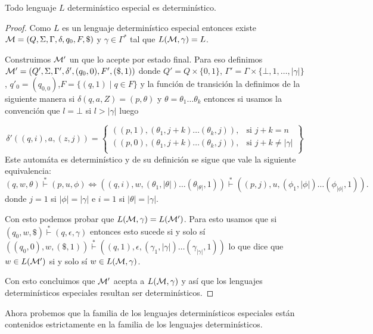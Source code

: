 \documentclass[tesis.tex]{subfiles}
\begin{document}
\begin{prop}
	Todo lenguaje $L$ \ic determinístico especial es \ic determinístico.
\end{prop}
\begin{proof}
	Como $L$ es un lenguaje \ic determinístico especial entonces existe ${\cal M} = (Q,\Sigma, \Gamma, \delta, q_0, F, \$)$ \APD y $\gamma \in \Gamma^{*}$ tal que $L({\cal M}, \gamma) = L$.
	
	Construimos $\cal M'$ un \APD que lo acepte por estado final.
	Para eso definimos ${\cal M}' = (Q',\Sigma, \Gamma', \delta', (q_0,0), F', (\$,1))$
	donde $Q' = Q \times \{ 0,1\}$, $\Gamma' = \Gamma \times \{ \bot ,1, \dots, |\gamma|  \}$, $q'_{0} = (q_{0, 0})$,$F = \{ (q,1) \mid q \in F \}$ y la función de transición la definimos de la siguiente manera si $\delta(q,a,Z) = (p, \theta)$ y $\theta = \theta_{1}\dots \theta_{k}$ entonces si usamos la convención que $l = \bot$ si $l>|\gamma|$ luego

	
	\[
	\delta'((q,i),a,(z,j)) = \left\{\begin{array}{lr}
		((p,1), (\theta_{1},j+k)\dots(\theta_{k},j)) , & \text{si } j+k = n\\
		((p,0), (\theta_{1},j+k)\dots(\theta_{k},j)) , & \text{si } j+k \neq |\gamma| \\
	\end{array}\right\}
	\]
	Este automáta es determinístico y de su definición se sigue que vale la siguiente equivalencia:
	\[
		(q, w, \theta) \overset{*}{\vdash} (p,u,\phi) \iff 
		((q,i), w, (\theta_{1}, |\theta|)\dots (\theta_{|\theta|}, 1)) \overset{*}{\vdash} ((p,j),u,(\phi_{1},|\phi|) \dots (\phi_{|\phi|}, 1)). 
	\]
	donde $j = 1$ si $|\phi| =|\gamma|$ e $i = 1$ si $|\theta| = |\gamma|$.
	
	
	Con esto podemos probar que $L ({\cal M}, \gamma) = L(\cal M')$.
	Para esto usamos que si $(q_{0},w, \$) \overset{*}{\vdash} (q,\epsilon, \gamma)$ entonces esto sucede si y solo sí
	$((q_{0},0), w, (\$,1)) \overset{*}{\vdash} 
	((q,1), \epsilon, (\gamma_1,|\gamma|) \dots (\gamma_{|\gamma|}, 1))$ lo que dice que $w \in L(\cal M')$ si y solo sí $w \in L({\cal M}, \gamma)$.
	
	Con esto concluimos que $\cal M'$ acepta a $L({\cal M}, \gamma)$ y así que los lenguajes \ic determinísticos especiales resultan ser \ic determinísticos.
	
	
\end{proof}

Ahora probemos que la familia de los lenguajes \ic determinísticos especiales están contenidos estrictamente en la familia de los lenguajes \ic determinísticos.
\end{document}
